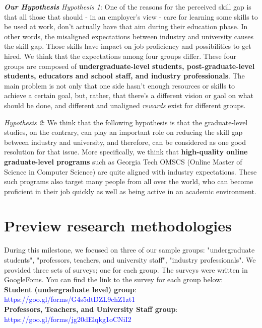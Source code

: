 \documentclass{sigchi}
\begin{document}
\textit{\textbf{Our Hypothesis}}\newline
\textit{Hypothesis 1}: One of the reasons for the perceived skill gap is that all those that should - in an employer's view - care for learning some skills to be used at work, don't actually have that aim during their education phase. In other words, the misaligned expectations between industry and university causes the skill gap. Those skills have impact on job proficiency and possibilities to get hired. We think that the expectations among four groups differ. These four groups are composed of \textbf{undergraduate-level students, post-graduate-level students, educators and school staff, and industry professionals}. The main problem is not only that one side hasn’t enough resources or skills to achieve a certain goal, but, rather, that there’s a different vision or gaol on what should be done, and different and unaligned \textit{rewards} exist for different groups.  

\textit{Hypothesis 2}:  We think that the following hypothesis is that the graduate-level studies, on the contrary, can play an important role on reducing the skill gap between industry and university, and therefore, can be considered as one good resolution for that issue. More specifically, we think that \textbf{high-quality online graduate-level programs} such as Georgia Tech OMSCS (Online Master of Science in Computer Science) are quite aligned with industry expectations. These such programs also target many people from all over the world, who can become proficient in their job quickly as well as being active in an academic environment.

\section{Preview research methodologies}

During this milestone, we focused on three of our sample groups: "undergraduate students", "professors, teachers, and university staff", "industry professionals". We provided three sets of surveys; one for each group. The surveys were written in GoogleFoms. You can find the link to the survey for each group below:\\

\textbf{Student (undergraduate level) group}:\\ \textcolor{blue}{https://goo.gl/forms/G4s5dtDZL9chZ1zt1}\\

\textbf{Professors, Teachers, and University Staff group}: \\ \textcolor{blue}{https://goo.gl/forms/jg20dElqkg1oCNiI2}\\
\end{document}

